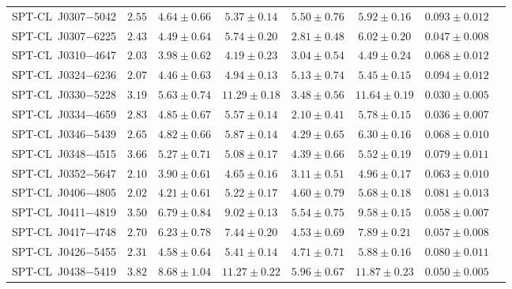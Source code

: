\begin{table}
{\begin{tabular}{lccccccc}
    SPT-CL~J0307$-$5042    &$ 2.55 $    &$ 4.64 \pm 0.66 $    &$ 5.37 \pm 0.14 $    &$ 5.50 \pm 0.76 $     &$ 5.92 \pm 0.16 $    &$ 0.093 \pm 0.012 $    \\ 
    SPT-CL~J0307$-$6225    &$ 2.43 $    &$ 4.49 \pm 0.64 $    &$ 5.74 \pm 0.20 $    &$ 2.81 \pm 0.48 $     &$ 6.02 \pm 0.20 $    &$ 0.047 \pm 0.008 $    \\ 
    SPT-CL~J0310$-$4647    &$ 2.03 $    &$ 3.98 \pm 0.62 $    &$ 4.19 \pm 0.23 $    &$ 3.04 \pm 0.54 $     &$ 4.49 \pm 0.24 $    &$ 0.068 \pm 0.012 $    \\ 
    SPT-CL~J0324$-$6236    &$ 2.07 $    &$ 4.46 \pm 0.63 $    &$ 4.94 \pm 0.13 $    &$ 5.13 \pm 0.74 $     &$ 5.45 \pm 0.15 $    &$ 0.094 \pm 0.012 $    \\ 
    SPT-CL~J0330$-$5228    &$ 3.19 $    &$ 5.63 \pm 0.74 $    &$ 11.29 \pm 0.18 $    &$ 3.48 \pm 0.56 $     &$ 11.64 \pm 0.19 $    &$ 0.030 \pm 0.005 $    \\ 
    SPT-CL~J0334$-$4659    &$ 2.83 $    &$ 4.85 \pm 0.67 $    &$ 5.57 \pm 0.14 $    &$ 2.10 \pm 0.41 $     &$ 5.78 \pm 0.15 $    &$ 0.036 \pm 0.007 $    \\ 
    SPT-CL~J0346$-$5439    &$ 2.65 $    &$ 4.82 \pm 0.66 $    &$ 5.87 \pm 0.14 $    &$ 4.29 \pm 0.65 $     &$ 6.30 \pm 0.16 $    &$ 0.068 \pm 0.010 $    \\ 
    SPT-CL~J0348$-$4515    &$ 3.66 $    &$ 5.27 \pm 0.71 $    &$ 5.08 \pm 0.17 $    &$ 4.39 \pm 0.66 $     &$ 5.52 \pm 0.19 $    &$ 0.079 \pm 0.011 $    \\ 
    SPT-CL~J0352$-$5647    &$ 2.10 $    &$ 3.90 \pm 0.61 $    &$ 4.65 \pm 0.16 $    &$ 3.11 \pm 0.51 $     &$ 4.96 \pm 0.17 $    &$ 0.063 \pm 0.010 $    \\ 
    SPT-CL~J0406$-$4805    &$ 2.02 $    &$ 4.21 \pm 0.61 $    &$ 5.22 \pm 0.17 $    &$ 4.60 \pm 0.79 $     &$ 5.68 \pm 0.18 $    &$ 0.081 \pm 0.013 $    \\ 
    SPT-CL~J0411$-$4819    &$ 3.50 $    &$ 6.79 \pm 0.84 $    &$ 9.02 \pm 0.13 $    &$ 5.54 \pm 0.75 $     &$ 9.58 \pm 0.15 $    &$ 0.058 \pm 0.007 $    \\ 
    SPT-CL~J0417$-$4748    &$ 2.70 $    &$ 6.23 \pm 0.78 $    &$ 7.44 \pm 0.20 $    &$ 4.53 \pm 0.69 $     &$ 7.89 \pm 0.21 $    &$ 0.057 \pm 0.008 $    \\ 
    SPT-CL~J0426$-$5455    &$ 2.31 $    &$ 4.58 \pm 0.64 $    &$ 5.41 \pm 0.14 $    &$ 4.71 \pm 0.71 $     &$ 5.88 \pm 0.16 $    &$ 0.080 \pm 0.011 $    \\ 
    SPT-CL~J0438$-$5419    &$ 3.82 $    &$ 8.68 \pm 1.04 $    &$ 11.27 \pm 0.22 $    &$ 5.96 \pm 0.67 $     &$ 11.87 \pm 0.23 $    &$ 0.050 \pm 0.005 $    \\ 

\end{tabular}}
\end{table}
